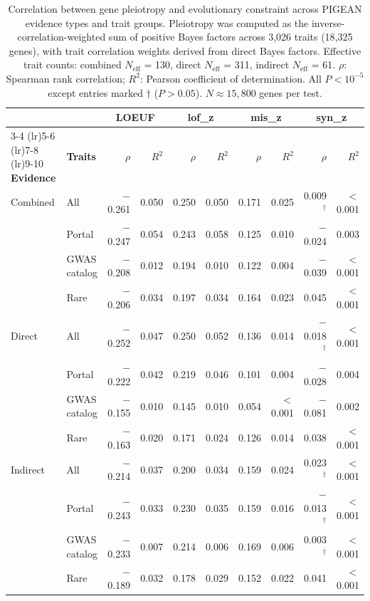 \FloatBarrier
\begin{table}[h!]
\centering
\caption{Correlation between gene pleiotropy and evolutionary constraint across PIGEAN evidence types and trait groups. Pleiotropy was computed as the inverse-correlation-weighted sum of positive Bayes factors across 3{,}026 traits (18{,}325 genes), with trait correlation weights derived from direct Bayes factors. Effective trait counts: combined $N_\text{eff}$ = 130, direct $N_\text{eff}$ = 311, indirect $N_\text{eff}$ = 61. $\rho$: Spearman rank correlation; $R^2$: Pearson coefficient of determination. All $P < 10^{-5}$ except entries marked $\dagger$ ($P > 0.05$). $N \approx 15{,}800$ genes per test.}
\label{tab:pleiotropy_constraint}
\small
\begin{tabular}{llrrrrrrrr}
\hline
& & \multicolumn{2}{c}{\textbf{LOEUF}} & \multicolumn{2}{c}{\textbf{lof\_z}} & \multicolumn{2}{c}{\textbf{mis\_z}} & \multicolumn{2}{c}{\textbf{syn\_z}} \\
\cmidrule(lr){3-4} \cmidrule(lr){5-6} \cmidrule(lr){7-8} \cmidrule(lr){9-10}
\textbf{Evidence} & \textbf{Traits} & $\rho$ & $R^2$ & $\rho$ & $R^2$ & $\rho$ & $R^2$ & $\rho$ & $R^2$ \\
\hline
Combined & All          & $-$0.261 & 0.050 & 0.250 & 0.050 & 0.171 & 0.025 & 0.009$^\dagger$    & $<$0.001 \\
         & Portal       & $-$0.247 & 0.054 & 0.243 & 0.058 & 0.125 & 0.010 & $-$0.024           & 0.003 \\
         & GWAS catalog & $-$0.208 & 0.012 & 0.194 & 0.010 & 0.122 & 0.004 & $-$0.039           & $<$0.001 \\
         & Rare         & $-$0.206 & 0.034 & 0.197 & 0.034 & 0.164 & 0.023 & 0.045              & $<$0.001 \\
\hline
Direct   & All          & $-$0.252 & 0.047 & 0.250 & 0.052 & 0.136 & 0.014 & $-$0.018$^\dagger$ & $<$0.001 \\
         & Portal       & $-$0.222 & 0.042 & 0.219 & 0.046 & 0.101 & 0.004 & $-$0.028           & 0.004 \\
         & GWAS catalog & $-$0.155 & 0.010 & 0.145 & 0.010 & 0.054 & $<$0.001 & $-$0.081        & 0.002 \\
         & Rare         & $-$0.163 & 0.020 & 0.171 & 0.024 & 0.126 & 0.014 & 0.038              & $<$0.001 \\
\hline
Indirect & All          & $-$0.214 & 0.037 & 0.200 & 0.034 & 0.159 & 0.024 & 0.023$^\dagger$    & $<$0.001 \\
         & Portal       & $-$0.243 & 0.033 & 0.230 & 0.035 & 0.159 & 0.016 & $-$0.013$^\dagger$ & $<$0.001 \\
         & GWAS catalog & $-$0.233 & 0.007 & 0.214 & 0.006 & 0.169 & 0.006 & 0.003$^\dagger$    & $<$0.001 \\
         & Rare         & $-$0.189 & 0.032 & 0.178 & 0.029 & 0.152 & 0.022 & 0.041              & $<$0.001 \\
\hline
\end{tabular}
\end{table}

